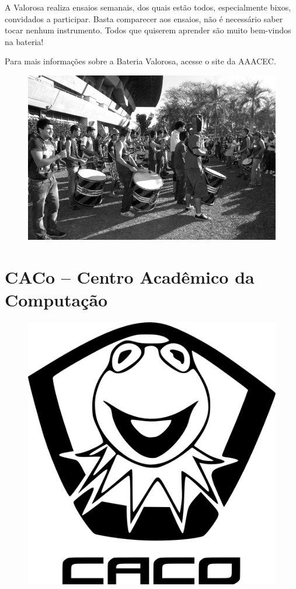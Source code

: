 A Valorosa realiza ensaios semanais, dos quais estão todos, especialmente bixos,
convidados a participar. Basta comparecer aos ensaios, não é necessário saber
tocar nenhum instrumento. Todos que quiserem aprender são muito bem-vindos na
bateria!

Para mais informações sobre a Bateria Valorosa, acesse o site da AAACEC.

\begin{figure}[H]
    \centering
    \includegraphics[scale=0.27]{img/valorosa_foto2.jpg}
\end{figure}

\newpage
\section{CACo -- Centro Acadêmico da Computação}

\begin{figure}[H]
    \centering
    \includegraphics[scale=0.37]{img/caco/logo.png}
\end{figure}

